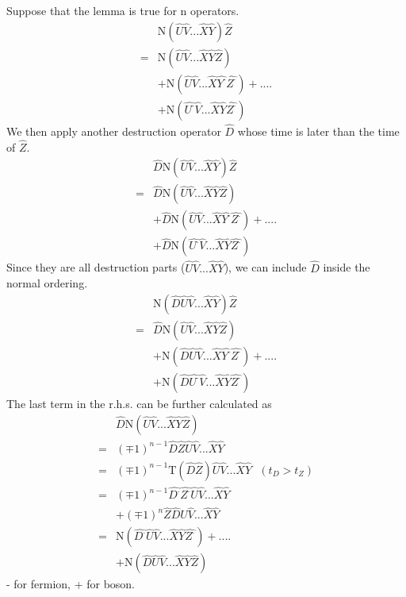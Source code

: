 Suppose that the lemma is true for n operators.
\begin{align}
&\mathrm{N}(\hat{U}\hat{V}...\hat{X}\hat{Y})\hat{Z} \nonumber \\
=&\mathrm{N}(\hat{U}\hat{V}...\hat{X}\hat{Y}\hat{Z})\nonumber \\
&+\mathrm{N}(\hat{U}\hat{V}...\hat{X}\hat{Y^{\cdot}}\hat{Z^{\cdot}})+....\nonumber \\
&+\mathrm{N}(\hat{U^{\cdot}}\hat{V}...\hat{X}\hat{Y}\hat{Z^{\cdot}})\nonumber
\end{align}
We then apply  another destruction operator $\hat{D}$ whose time is later than the time of $\hat{Z}$.
\begin{align}
&\hat{D}\mathrm{N}(\hat{U}\hat{V}...\hat{X}\hat{Y})\hat{Z} \nonumber \\
=&\hat{D}\mathrm{N}(\hat{U}\hat{V}...\hat{X}\hat{Y}\hat{Z})\nonumber \\
&+\hat{D}\mathrm{N}(\hat{U}\hat{V}...\hat{X}\hat{Y^{\cdot}}\hat{Z^{\cdot}})+....\nonumber \\
&+\hat{D}\mathrm{N}(\hat{U^{\cdot}}\hat{V}...\hat{X}\hat{Y}\hat{Z^{\cdot}})\nonumber
\end{align}
Since they are all destruction parts ($\hat{U}\hat{V}...\hat{X}\hat{Y}$), we can include $\hat{D}$ inside the normal ordering.
\begin{align}
&\mathrm{N}(\hat{D}\hat{U}\hat{V}...\hat{X}\hat{Y})\hat{Z} \nonumber \\
=&\hat{D}\mathrm{N}(\hat{U}\hat{V}...\hat{X}\hat{Y}\hat{Z})\nonumber \\
&+\mathrm{N}(\hat{D}\hat{U}\hat{V}...\hat{X}\hat{Y^{\cdot}}\hat{Z^{\cdot}})+....\nonumber \\
&+\mathrm{N}(\hat{D}\hat{U^{\cdot}}\hat{V}...\hat{X}\hat{Y}\hat{Z^{\cdot}})\nonumber
\end{align}
The last term in the r.h.s. can be further calculated as
\begin{align}
&\hat{D}\mathrm{N}(\hat{U}\hat{V}...\hat{X}\hat{Y}\hat{Z})\nonumber \\
=&(\mp 1)^{n-1}\hat{D}\hat{Z}\hat{U}\hat{V}...\hat{X}\hat{Y}  \nonumber \\
=&(\mp 1)^{n-1}\mathrm{T}(\hat{D}\hat{Z})\hat{U}\hat{V}...\hat{X}\hat{Y} \ \ \ (t_D>t_Z) \nonumber \\
=&(\mp 1)^{n-1}\hat{D^{\cdot}}\hat{Z^{\cdot}}\hat{U}\hat{V}...\hat{X}\hat{Y}  \nonumber \\
&+(\mp 1)^{n}\hat{Z}\hat{D}\hat{U}\hat{V}...\hat{X}\hat{Y}  \nonumber \\
=&\mathrm{N}(\hat{D^{\cdot}}\hat{U}\hat{V}...\hat{X}\hat{Y}\hat{Z^{\cdot}})+....\nonumber \\
&+\mathrm{N}(\hat{D}\hat{U}\hat{V}...\hat{X}\hat{Y}\hat{Z})\nonumber
\end{align}
- for fermion, + for boson.

